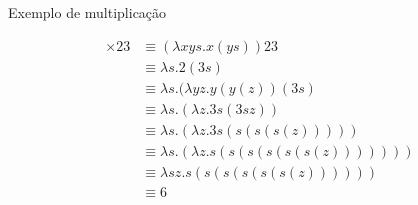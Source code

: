 \begin{frame}[fragile]{Exemplo de multiplicação}

    \begin{align*}
        \times 23 &\equiv (\lambda xys.x(ys))23 \\
        &\equiv \lambda s.2(3s) \\
        &\equiv \lambda s.(\lambda yz.y(y(z))(3s) \\
        &\equiv \lambda s.(\lambda z.3s(3sz)) \\
        &\equiv \lambda s.(\lambda z.3s(s(s(s(z))))) \\
        &\equiv \lambda s.(\lambda z.s(s(s(s(s(s(z))))))) \\
        &\equiv \lambda sz.s(s(s(s(s(s(z)))))) \\
        &\equiv 6
    \end{align*}

\end{frame}
